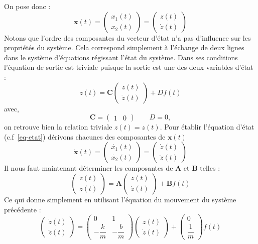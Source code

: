 On pose donc :
\[
    \boldsymbol{x}(t)=
    \begin{pmatrix} x_1(t) \\ x_2(t) \end{pmatrix}=
    \begin{pmatrix} z(t) \\ \dot{z}(t) \end{pmatrix}
\]
Notons que l'ordre des composantes du vecteur d'état n'a pas d'influence sur
les propriétés du système. Cela correspond simplement à l'échange de deux lignes
dans le système d'équations régissant l'état du système.
Dans ses conditions l'équation de sortie est triviale puisque la sortie est
une des deux variables d'état :
\[
    z(t)=\boldsymbol{C}\begin{pmatrix} z(t)\\\dot{z}(t)\end{pmatrix} + Df(t)
\]
avec,
\[
    \boldsymbol{C}=\begin{pmatrix} 1 & 0 \end{pmatrix}\quad\quad D=0,
\]
on retrouve bien la relation triviale $z(t)=z(t)$.
\newpage
\restoregeometry
\captionsetup{width=0.9\linewidth}
Pour établir l'équation d'état (c.f~\cref{eq-etat}) dérivons chacunes des 
composantes de $\boldsymbol{x}(t)$
\[
    \boldsymbol{\dot{x}}(t)=
    \begin{pmatrix} \dot{x_1}(t) \\ \dot{x_2}(t) \end{pmatrix}=
    \begin{pmatrix} \dot{z}(t) \\ \ddot{z}(t) \end{pmatrix}
\]
Il nous faut maintenant déterminer les composantes de $\boldsymbol{A}$ et 
$\boldsymbol{B}$ telles :
\[
    \begin{pmatrix} \dot{z}(t) \\ \ddot{z}(t) \end{pmatrix}=
    \boldsymbol{A}\begin{pmatrix} z(t) \\ \dot{z}(t) \end{pmatrix} +
    \boldsymbol{B}f(t)
\]
Ce qui donne simplement en utilisant l'équation du mouvement du système 
précédente :
\[
    \begin{pmatrix} \dot{z}(t) \\ \ddot{z}(t) \end{pmatrix}=
    \begin{pmatrix} 
        0 & 1 \\[1em]
        -\dfrac{k}{m} & -\dfrac{b}{m}
    \end{pmatrix} 
    \begin{pmatrix} z(t) \\ \dot{z}(t) \end{pmatrix} +
    \begin{pmatrix} 0 \\[1em] \dfrac{1}{m} \end{pmatrix}f(t)
\]
